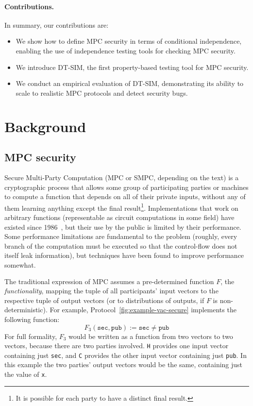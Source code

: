 \documentclass[acmlarge, manuscript, screen, review, anonymous, table]{acmart}
\newcommand{\bigpar}[1]{\left( #1 \right)}
\newcommand{\inlinecode}[2][cho]{\lstinline[language=#1]{#2}}
\newcommand{\toolname}{\textsc{DT-SIM}\xspace}
\begin{document}
\paragraph{Contributions.}
In summary, our contributions are:
%
\begin{itemize}
\item We show how to define MPC security in terms of conditional independence, enabling the use of independence testing tools for checking MPC security.
\item We introduce \toolname, the first property-based testing tool for MPC security.
\item We conduct an empirical evaluation of \toolname, demonstrating its ability to scale to realistic MPC protocols and detect security bugs.
\end{itemize}



\section{Background}

\subsection{MPC security}

Secure Multi-Party Computation (MPC or SMPC, depending on the text)
is a cryptographic process that allows some group of participating parties or machines
to compute a function that depends on all of their private inputs,
without any of them learning anything except the final result\footnote{
    It is possible for each party to have a distinct final result.
}.
Implementations that work on arbitrary functions (representable as circuit computations in some field)
have existed since 1986~\cite{yao1986generate}, %
but their use by the public is limited by their performance.
Some performance limitations are fundamental to the problem
(roughly, every branch of the computation must be executed so that the control-flow does not itself leak information),
but techniques have been found to improve performance somewhat.

The traditional expression of MPC assumes a pre-determined function $F$, the \emph{functionality},
mapping the tuple of all participants' input vectors to the respective tuple of output vectors
(or to distributions of outputs, if $F$ is non-deterministic).
For example, Protocol~\ref{fig:example-vac-secure} implements the following function:
$$F_3\bigpar{\mathtt{sec}, \mathtt{pub}}
  := \mathtt{sec} \neq \mathtt{pub}$$
For full formality, $F_3$ would be written as a function from two vectors to two vectors, because there are two parties involved.
\inlinecode{H} provides one input vector containing just \inlinecode{sec},
and \inlinecode{C} provides the other input vector containing just \inlinecode{pub}.
In this example the two parties' output vectors would be the same, containing just the value of \inlinecode{x}.
\end{document}
